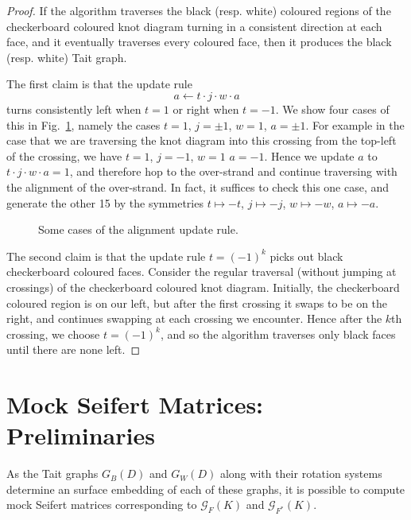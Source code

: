 \documentclass[12pt]{report}
\theoremstyle{upright}
\begin{document}
\begin{proof}
	If the algorithm traverses the black (resp. white) coloured regions of the checkerboard coloured knot diagram turning in a consistent direction at each face, and it eventually traverses every coloured face, then it produces the black (resp. white) Tait graph.
	
	The first claim is that the update rule
	\[a \leftarrow t \cdot j \cdot w \cdot a\]
	turns consistently left when $t = 1$ or right when $t = -1$. We show four cases of this in Fig.~\ref{fig:alignment-update-rule}, namely the cases $t = 1$, $j = \pm 1$, $w = 1$, $a = \pm 1$. For example in the case that we are traversing the knot diagram into this crossing from the top-left of the crossing, we have $t = 1$,  $j = -1$, $w = 1$ $a = -1$. Hence we update $a$ to $t \cdot j \cdot w \cdot a = 1$, and therefore hop to the over-strand and continue traversing with the alignment of the over-strand. In fact, it suffices to check this one case, and generate the other 15 by the symmetries $t \mapsto -t$, $j \mapsto -j$, $w \mapsto -w$, $a \mapsto -a$.
	
	\begin{figure}[hbt!]
		\centering
		\def\svgscale{0.3}
		
		
		\caption{Some cases of the alignment update rule.}
		\label{fig:alignment-update-rule}
	\end{figure}
	
	The second claim is that the update rule $t = (-1)^{k}$ picks out black checkerboard coloured faces. Consider the regular traversal (without jumping at crossings) of the checkerboard coloured knot diagram. Initially, the checkerboard coloured region is on our left, but after the first crossing it swaps to be on the right, and continues swapping at each crossing we encounter. Hence after the $k$th crossing, we choose $t = (-1)^{k}$, and so the algorithm traverses only black faces until there are none left. 
\end{proof}

\section{Mock Seifert Matrices: Preliminaries}

As the Tait graphs $G_{B}(D)$ and $G_{W}(D)$ along with their rotation systems determine an surface embedding of each of these graphs, it is possible to compute mock Seifert matrices corresponding to $\mathcal{G}_{F}(K)$ and $\mathcal{G}_{F^{*}}(K)$.
\end{document}

